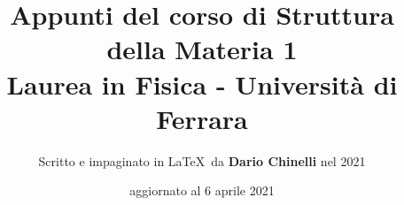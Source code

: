 \documentclass[11pt]{article}
\begin{document}
\title{\textbf{Appunti del corso di Struttura della Materia 1} \\
Laurea in Fisica - Università di Ferrara} 

\author{Scritto e impaginato in \LaTeX\ da \textbf{Dario Chinelli} nel 2021}

\date{aggiornato al 6 aprile 2021}

\maketitle

\newpage

\tableofcontents

    

    

    

    

    

    

    

    

    

    

    

    
    

    

    

     
    
    
    
    
    
    
    
\end{document}
